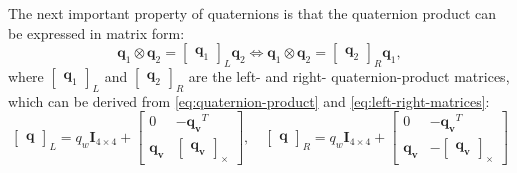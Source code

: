 The next important property of quaternions is that the quaternion product can be expressed in matrix form:
\begin{equation}
    \mathbf{q}_1\otimes\mathbf{q}_2=\begin{bmatrix}\mathbf{q}_1\end{bmatrix}_L  \mathbf{q}_2\Longleftrightarrow
    \mathbf{q}_1\otimes\mathbf{q}_2=\begin{bmatrix}\mathbf{q}_2\end{bmatrix}_R\mathbf{q}_1,
    \label{eq:left-right-matrices}
\end{equation}
where $\begin{bmatrix}\mathbf{q}_1\end{bmatrix}_L$ and $\begin{bmatrix}\mathbf{q}_2\end{bmatrix}_R$ are the left- and right- quaternion-product matrices, which can be derived from \eqref{eq:quaternion-product} and \eqref{eq:left-right-matrices}:
\begin{equation}
    \begin{bmatrix}\mathbf{q}\end{bmatrix}_L=q_w\mathbf{I}_{4\times 4}+
    \begin{bmatrix}
        0 & -\mathbf{q_v}^T \\
        \mathbf{q_v} & \begin{bmatrix}\mathbf{q_v}\end{bmatrix}_\times
    \end{bmatrix}, \quad
    \begin{bmatrix}\mathbf{q}\end{bmatrix}_R=q_w\mathbf{I}_{4\times 4}+
    \begin{bmatrix}
    0 & -\mathbf{q_v}^T \\
    \mathbf{q_v} & -\begin{bmatrix}\mathbf{q_v}\end{bmatrix}_\times
    \end{bmatrix}
    \label{eq:left-right-mat-def}
\end{equation}

